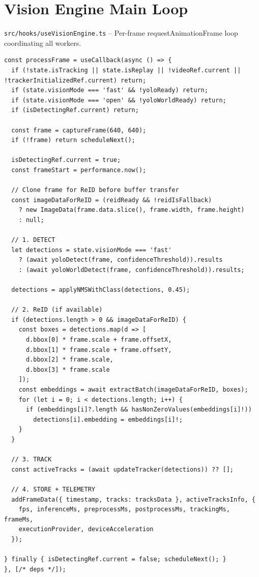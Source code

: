 \section{Vision Engine Main Loop}
\label{sec:code-engine}
\texttt{src/hooks/useVisionEngine.ts} -- Per-frame requestAnimationFrame loop coordinating all workers.

\begin{lstlisting}[style=typescript, caption={useVisionEngine processFrame()}, label={lst:engine-loop}]
const processFrame = useCallback(async () => {
  if (!state.isTracking || state.isReplay || !videoRef.current || !trackerInitializedRef.current) return;
  if (state.visionMode === 'fast' && !yoloReady) return;
  if (state.visionMode === 'open' && !yoloWorldReady) return;
  if (isDetectingRef.current) return;

  const frame = captureFrame(640, 640);
  if (!frame) return scheduleNext();

  isDetectingRef.current = true;
  const frameStart = performance.now();

  // Clone frame for ReID before buffer transfer
  const imageDataForReID = (reidReady && !reidIsFallback)
    ? new ImageData(frame.data.slice(), frame.width, frame.height)
    : null;

  // 1. DETECT
  let detections = state.visionMode === 'fast'
    ? (await yoloDetect(frame, confidenceThreshold)).results
    : (await yoloWorldDetect(frame, confidenceThreshold)).results;

  detections = applyNMSWithClass(detections, 0.45);

  // 2. ReID (if available)
  if (detections.length > 0 && imageDataForReID) {
    const boxes = detections.map(d => [
      d.bbox[0] * frame.scale + frame.offsetX,
      d.bbox[1] * frame.scale + frame.offsetY,
      d.bbox[2] * frame.scale,
      d.bbox[3] * frame.scale
    ]);
    const embeddings = await extractBatch(imageDataForReID, boxes);
    for (let i = 0; i < detections.length; i++) {
      if (embeddings[i]?.length && hasNonZeroValues(embeddings[i]!))
        detections[i].embedding = embeddings[i]!;
    }
  }

  // 3. TRACK
  const activeTracks = (await updateTracker(detections)) ?? [];

  // 4. STORE + TELEMETRY
  addFrameData({ timestamp, tracks: tracksData }, activeTracksInfo, {
    fps, inferenceMs, preprocessMs, postprocessMs, trackingMs, frameMs,
    executionProvider, deviceAcceleration
  });

} finally { isDetectingRef.current = false; scheduleNext(); }
}, [/* deps */]);
\end{lstlisting}

